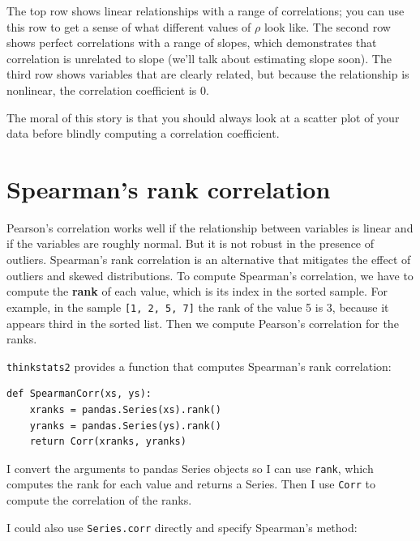 The top row shows linear relationships with a range of correlations;
you can use this row to get a sense of what different values of
$\rho$ look like.  The second row shows perfect correlations with a
range of slopes, which demonstrates that correlation is unrelated to
slope (we'll talk about estimating slope soon).  The third row shows
variables that are clearly related, but because the relationship is
nonlinear, the correlation coefficient is 0.

The moral of this story is that you should always look at a scatter
plot of your data before blindly computing a correlation coefficient.


\section{Spearman's rank correlation}

Pearson's correlation works well if the relationship between variables
is linear and if the variables are roughly normal.  But it is not
robust in the presence of outliers.
Spearman's rank correlation is an alternative that mitigates the
effect of outliers and skewed distributions.  To compute Spearman's
correlation, we have to compute the {\bf rank} of each value, which is its
index in the sorted sample.  For example, in the sample {\tt [1, 2, 5, 7]}
the rank of the value 5 is 3, because it appears third in the sorted
list.  Then we compute Pearson's correlation for the ranks.

{\tt thinkstats2} provides a function that computes Spearman's rank
correlation:

\begin{verbatim}
def SpearmanCorr(xs, ys):
    xranks = pandas.Series(xs).rank()
    yranks = pandas.Series(ys).rank()
    return Corr(xranks, yranks)
\end{verbatim}

I convert the arguments to pandas Series objects so I can use
{\tt rank}, which computes the rank for each value and returns
a Series.  Then I use {\tt Corr} to compute the correlation
of the ranks.

I could also use {\tt Series.corr} directly and specify
Spearman's method:

